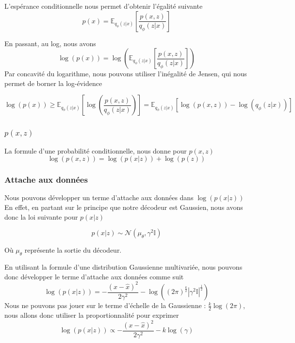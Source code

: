 \documentclass{article}
\begin{document}
L'espérance conditionnelle nous permet d'obtenir l'égalité suivante
\begin{equation}
    p(x) = \mathbb{E}_{q_\phi(z|x)}\left[\frac{p(x,z)}{q_\phi(z|x)}\right]
\end{equation}

En passant, au log, nous avons 
\begin{equation*}
    \log(p(x)) = \log\left(\mathbb{E}_{q_\phi(z|x)}\left[\frac{p(x,z)}{q_\phi(z|x)}\right]\right)
\end{equation*}
Par concavité du logarithme, nous pouvons utiliser l'inégalité de Jensen, qui nous permet de borner la log-évidence

\begin{equation}
    \log(p(x)) \geq \mathbb{E}_{q_\phi(z|x)}\left[\log\left(\frac{p(x,z)}{q_\phi(z|x)}\right)\right] = \mathbb{E}_{q_\phi(z|x)}[\log(p(x,z)) - \log(q_\phi(z|x))] 
\end{equation}

\subsubsection{$p(x,z)$}

La formule d'une probabilité conditionnelle, nous donne pour $p(x,z)$
\begin{equation*}
    \log(p(x,z)) = \log(p(x|z)) + \log(p(z))
\end{equation*}

\subsubsection{Attache aux données}\label{attdata}

Nous pouvons développer un terme d'attache aux données dans $\log(p(x|z))$
En effet, en partant sur le principe que notre décodeur est Gaussien, nous avons donc la loi suivante pour $p(x|z)$

\begin{equation*}
    p(x|z) \sim \mathcal{N}(\mu_\theta, \gamma^2\mathbb{I})
\end{equation*}

Où $\mu_\theta$ représente la sortie du décodeur.

En utilisant la formule d'une distribution Gaussienne multivariée, nous pouvons donc développer le terme d'attache aux données comme suit 
\begin{equation*}
    \log(p(x|z)) = -\frac{(x-\hat{x})^2}{2\gamma^2} - \log((2\pi)^{\frac{k}{2}} |\gamma^2\mathbb{I}|^\frac{1}{2}) 
\end{equation*}
Nous ne pouvons pas jouer sur le terme d'échelle de la Gaussienne : $\frac{k}{2}\log(2\pi)$, nous allons donc utiliser la proportionnalité pour exprimer 
\begin{equation}
    \log(p(x|z)) \propto -\frac{(x-\hat{x})^2}{2\gamma^2} - k\log(\gamma) 
\end{equation}
\end{document}

